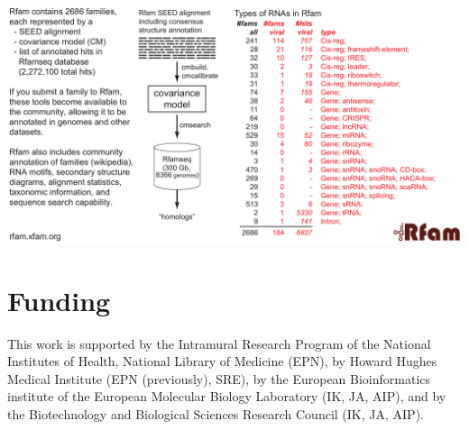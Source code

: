 \documentclass[custom,landscape,final,30pt,plainboxedsections]{sciposter-titleskipsmall}
\begin{document}
\begin{multicols}{3}
\begin{center}
\includegraphics[width=13.5in]{figs/rfam-poster}
\end{center}

\section*{Funding}
\begin{footnotesize}
This work is supported by the Intramural Research Program of the
National Institutes of Health, National Library of Medicine (EPN), 
by Howard Hughes Medical Institute (EPN (previously), SRE), by the European
Bioinformatics institute of the European Molecular Biology Laboratory
(IK, JA, AIP), and by the Biotechnology and Biological Sciences
Research Council (IK, JA, AIP).
\end{footnotesize}


\begin{tiny}

\end{tiny}

\end{multicols}
\end{document}
